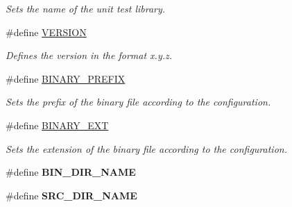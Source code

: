\begin{DoxyCompactItemize}
\begin{DoxyCompactList}\small\item\em Sets the name of the unit test library. \end{DoxyCompactList}\item 
\hypertarget{group___automatic___variables_ga1c6d5de492ac61ad29aec7aa9a436bbf}{\#define \hyperlink{group___automatic___variables_ga1c6d5de492ac61ad29aec7aa9a436bbf}{V\+E\+R\+S\+I\+O\+N}}\label{group___automatic___variables_ga1c6d5de492ac61ad29aec7aa9a436bbf}

\begin{DoxyCompactList}\small\item\em Defines the version in the format x.\+y.\+z. \end{DoxyCompactList}\item 
\hypertarget{group___automatic___variables_ga7564a1406feda468ce0cb03cc8f70216}{\#define \hyperlink{group___automatic___variables_ga7564a1406feda468ce0cb03cc8f70216}{B\+I\+N\+A\+R\+Y\+\_\+\+P\+R\+E\+F\+I\+X}}\label{group___automatic___variables_ga7564a1406feda468ce0cb03cc8f70216}

\begin{DoxyCompactList}\small\item\em Sets the prefix of the binary file according to the configuration. \end{DoxyCompactList}\item 
\hypertarget{group___automatic___variables_ga33221a22bc4fd9183788b7a02eb21a1b}{\#define \hyperlink{group___automatic___variables_ga33221a22bc4fd9183788b7a02eb21a1b}{B\+I\+N\+A\+R\+Y\+\_\+\+E\+X\+T}}\label{group___automatic___variables_ga33221a22bc4fd9183788b7a02eb21a1b}

\begin{DoxyCompactList}\small\item\em Sets the extension of the binary file according to the configuration. \end{DoxyCompactList}\item 
\hypertarget{group___automatic___variables_ga15b68a57a767111eeccbb4361ef27d28}{\#define {\bfseries B\+I\+N\+\_\+\+D\+I\+R\+\_\+\+N\+A\+M\+E}}\label{group___automatic___variables_ga15b68a57a767111eeccbb4361ef27d28}

\item 
\hypertarget{group___automatic___variables_gae4c5345f24367773479bbdc89f11ad73}{\#define {\bfseries S\+R\+C\+\_\+\+D\+I\+R\+\_\+\+N\+A\+M\+E}}\label{group___automatic___variables_gae4c5345f24367773479bbdc89f11ad73}


\end{DoxyCompactItemize}
